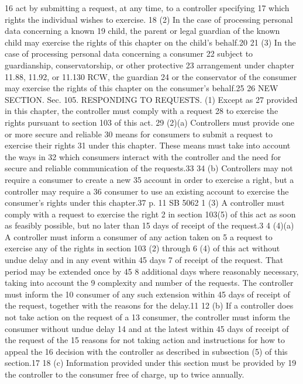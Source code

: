 16 act by submitting a request, at any time, to a controller specifying
17 which rights the individual wishes to exercise.
18 (2) In the case of processing personal data concerning a known
19 child, the parent or legal guardian of the known child may exercise
the rights of this chapter on the child's behalf.20
21 (3) In the case of processing personal data concerning a consumer
22 subject to guardianship, conservatorship, or other protective
23 arrangement under chapter 11.88, 11.92, or 11.130 RCW, the guardian
24 or the conservator of the consumer may exercise the rights of this
chapter on the consumer's behalf.25
26 NEW SECTION. Sec. 105. RESPONDING TO REQUESTS. (1) Except as
27 provided in this chapter, the controller must comply with a request
28 to exercise the rights pursuant to section 103 of this act.
29 (2)(a) Controllers must provide one or more secure and reliable
30 means for consumers to submit a request to exercise their rights
31 under this chapter. These means must take into account the ways in
32 which consumers interact with the controller and the need for secure
and reliable communication of the requests.33
34 (b) Controllers may not require a consumer to create a new
35 account in order to exercise a right, but a controller may require a
36 consumer to use an existing account to exercise the consumer's rights
under this chapter.37
p. 11 SB 5062
1 (3) A controller must comply with a request to exercise the right
2 in section 103(5) of this act as soon as feasibly possible, but no
later than 15 days of receipt of the request.3
4 (4)(a) A controller must inform a consumer of any action taken on
5 a request to exercise any of the rights in section 103 (2) through
6 (4) of this act without undue delay and in any event within 45 days
7 of receipt of the request. That period may be extended once by 45
8 additional days where reasonably necessary, taking into account the
9 complexity and number of the requests. The controller must inform the
10 consumer of any such extension within 45 days of receipt of the
request, together with the reasons for the delay.11
12 (b) If a controller does not take action on the request of a
13 consumer, the controller must inform the consumer without undue delay
14 and at the latest within 45 days of receipt of the request of the
15 reasons for not taking action and instructions for how to appeal the
16 decision with the controller as described in subsection (5) of this
section.17
18 (c) Information provided under this section must be provided by
19 the controller to the consumer free of charge, up to twice annually.
